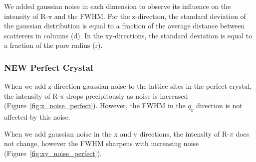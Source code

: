 \documentclass{article}
\begin{document}
  We added gaussian noise in each dimension to observe its influence on the intensity
  of R-$\pi$ and the FWHM. For the z-direction, the standard deviation of the 
  gaussian distribution is equal to a fraction of the average distance between scatterers
  in columns (d). In the xy-directions, the standard deviation is equal to a fraction 
  of the pore radius (r).

  \subsubsection{\textbf{NEW} Perfect Crystal}

  When we add z-direction gaussian noise to the lattice sites in the perfect
  crystal, the intensity of R-$\pi$ drops precipitously as noise is increased
  (Figure~\ref{fig:z_noise_perfect}).  However, the FWHM in the $q_y$ direction
  is not affected by this noise.

  When we add gaussian noise in the x and y directions, the intensity of
  R-$\pi$ does not change, however the FWHM sharpens with increasing noise
  (Figure~\ref{fig:xy_noise_perfect}). 
\end{document}
